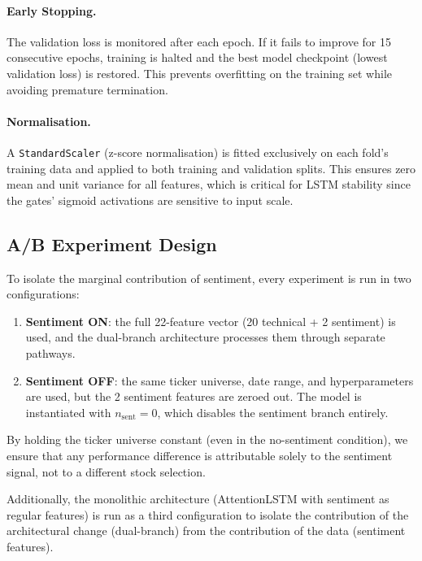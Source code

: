 \paragraph{Early Stopping.}
The validation loss is monitored after each epoch.  If it fails to improve for
15 consecutive epochs, training is halted and the best model checkpoint (lowest
validation loss) is restored.  This prevents overfitting on the training set
while avoiding premature termination.

\paragraph{Normalisation.}
A \texttt{StandardScaler} (z-score normalisation) is fitted exclusively on each
fold's training data and applied to both training and validation splits.  This
ensures zero mean and unit variance for all features, which is critical for
LSTM stability since the gates' sigmoid activations are sensitive to input
scale.

\subsection{A/B Experiment Design}
\label{sec:ab-design}

To isolate the marginal contribution of sentiment, every experiment is run in
two configurations:

\begin{enumerate}
  \item \textbf{Sentiment ON}: the full 22-feature vector (20 technical + 2
        sentiment) is used, and the dual-branch architecture processes them
        through separate pathways.

  \item \textbf{Sentiment OFF}: the same ticker universe, date range, and
        hyperparameters are used, but the 2 sentiment features are zeroed out.
        The model is instantiated with $n_{\text{sent}} = 0$, which disables the
        sentiment branch entirely.
\end{enumerate}

\noindent
By holding the ticker universe constant (even in the no-sentiment condition),
we ensure that any performance difference is attributable solely to the
sentiment signal, not to a different stock selection.

Additionally, the monolithic architecture (AttentionLSTM with sentiment as
regular features) is run as a third configuration to isolate the contribution of
the architectural change (dual-branch) from the contribution of the data
(sentiment features).


